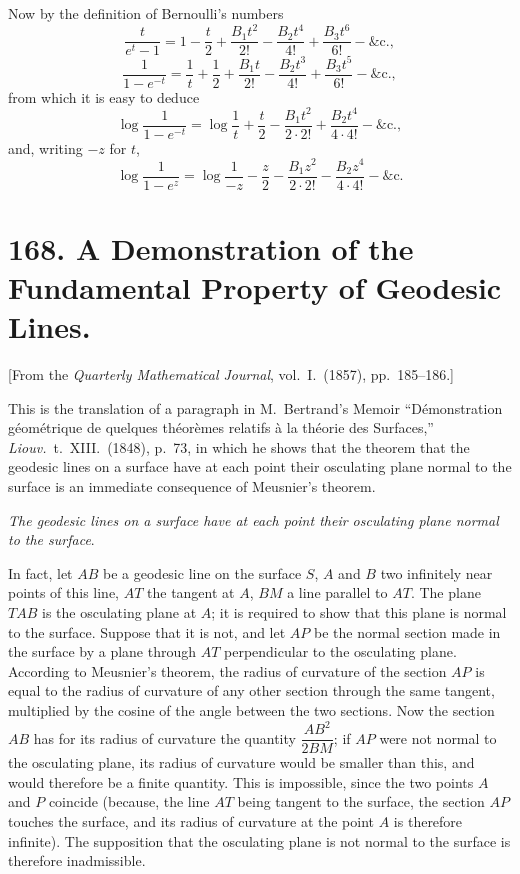\documentclass[11pt,a4paper]{article}
\theoremstyle{plain}
\begin{document}
Now by the definition of Bernoulli's numbers
\[
\frac{t}{e^t-1} = 1 - \frac{t}{2} + \frac{B_1 t^2}{2!} - \frac{B_2 t^4}{4!} + \frac{B_3 t^6}{6!} - \&\text{c.},
\]
\[
\frac{1}{1-e^{-t}} = \frac{1}{t} + \frac{1}{2} + \frac{B_1 t}{2!} - \frac{B_2 t^3}{4!} + \frac{B_3 t^5}{6!} - \&\text{c.},
\]
from which it is easy to deduce
\[
\log\frac{1}{1-e^{-t}} = \log\frac{1}{t} + \frac{t}{2} - \frac{B_1 t^2}{2 \cdot 2!} + \frac{B_2 t^4}{4 \cdot 4!} - \&\text{c.},
\]
and, writing $-z$ for $t$,
\[
\log\frac{1}{1-e^{z}} = \log\frac{1}{-z} - \frac{z}{2} - \frac{B_1 z^2}{2 \cdot 2!} - \frac{B_2 z^4}{4 \cdot 4!} - \&\text{c.}
\]


\newpage
\section*{168. A Demonstration of the Fundamental Property of Geodesic Lines.}

[From the \textit{Quarterly Mathematical Journal}, vol.~I.~(1857), pp.~185--186.]

This is the translation of a paragraph in M.~Bertrand's Memoir ``D\'emonstration g\'eom\'etrique de quelques th\'eor\`emes relatifs \`a la th\'eorie des Surfaces,'' \textit{Liouv.}\ t.~XIII.~(1848), p.~73, in which he shows that the theorem that the geodesic lines on a surface have at each point their osculating plane normal to the surface is an immediate consequence of Meusnier's theorem.

\textit{The geodesic lines on a surface have at each point their osculating plane normal to the surface}.

In fact, let $AB$ be a geodesic line on the surface $S$, $A$ and $B$ two infinitely near points of this line, $AT$ the tangent at $A$, $BM$ a line parallel to $AT$. The plane $TAB$ is the osculating plane at $A$; it is required to show that this plane is normal to the surface. Suppose that it is not, and let $AP$ be the normal section made in the surface by a plane through $AT$ perpendicular to the osculating plane. According to Meusnier's theorem, the radius of curvature of the section $AP$ is equal to the radius of curvature of any other section through the same tangent, multiplied by the cosine of the angle between the two sections. Now the section $AB$ has for its radius of curvature the quantity $\dfrac{AB^2}{2BM}$; if $AP$ were not normal to the osculating plane, its radius of curvature would be smaller than this, and would therefore be a finite quantity. This is impossible, since the two points $A$ and $P$ coincide (because, the line $AT$ being tangent to the surface, the section $AP$ touches the surface, and its radius of curvature at the point $A$ is therefore infinite). The supposition that the osculating plane is not normal to the surface is therefore inadmissible.
\end{document}
